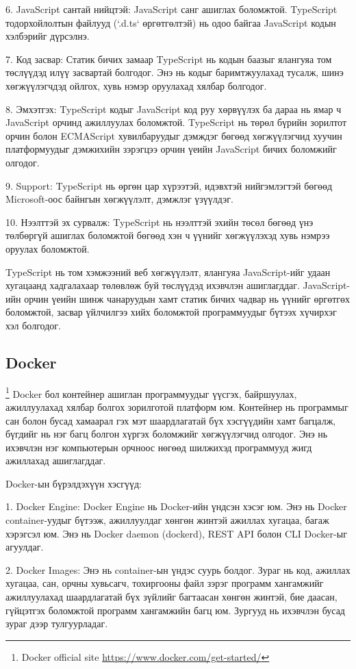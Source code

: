 			6. JavaScript сантай нийцтэй: JavaScript санг ашиглах боломжтой. TypeScript тодорхойлолтын файлууд (`.d.ts` өргөтгөлтэй) нь одоо байгаа JavaScript кодын хэлбэрийг дүрсэлнэ.
			
			7. Код засвар: Статик бичих замаар TypeScript нь кодын баазыг ялангуяа том төслүүдэд илүү засвартай болгодог. Энэ нь кодыг баримтжуулахад тусалж, шинэ хөгжүүлэгчдэд ойлгох, хувь нэмэр оруулахад хялбар болгодог.
			
			8. Эмхэтгэх: TypeScript кодыг JavaScript код руу хөрвүүлэх ба дараа нь ямар ч JavaScript орчинд ажиллуулах боломжтой. TypeScript нь төрөл бүрийн зорилтот орчин болон ECMAScript хувилбаруудыг дэмждэг бөгөөд хөгжүүлэгчид хуучин платформуудыг дэмжихийн зэрэгцээ орчин үеийн JavaScript бичих боломжийг олгодог.
			
			9. Support: TypeScript нь өргөн цар хүрээтэй, идэвхтэй нийгэмлэгтэй бөгөөд Microsoft-оос байнгын хөгжүүлэлт, дэмжлэг үзүүлдэг.
			
			10. Нээлттэй эх сурвалж: TypeScript нь нээлттэй эхийн төсөл бөгөөд үнэ төлбөргүй ашиглах боломжтой бөгөөд хэн ч үүнийг хөгжүүлэхэд хувь нэмрээ оруулах боломжтой.
			
			TypeScript нь том хэмжээний веб хөгжүүлэлт, ялангуяа JavaScript-ийг удаан хугацаанд хадгалахаар төлөвлөж буй төслүүдэд ихэвчлэн ашиглагддаг. JavaScript-ийн орчин үеийн шинж чанаруудын хамт статик бичих чадвар нь үүнийг өргөтгөх боломжтой, засвар үйлчилгээ хийх боломжтой программуудыг бүтээх хүчирхэг хэл болгодог. 
	\pagebreak
\subsection{Docker}
		\footnote{Docker official site \url{https://www.docker.com/get-started/}}
			\quad \quad Docker бол контейнер ашиглан программуудыг үүсгэх, байршуулах, ажиллуулахад хялбар болгох зорилготой платформ юм. Контейнер нь программыг сан болон бусад хамаарал гэх мэт шаардлагатай бүх хэсгүүдийн хамт багцалж, бүгдийг нь нэг багц болгон хүргэх боломжийг хөгжүүлэгчид олгодог. Энэ нь ихэвчлэн нэг компьютерын орчноос нөгөөд шилжихэд программууд жигд ажиллахад ашиглагддаг.

			Docker-ын бүрэлдэхүүн хэсгүүд:
			
			1. Docker Engine: Docker Engine нь Docker-ийн үндсэн хэсэг юм. Энэ нь Docker container-уудыг бүтээж, ажиллуулдаг хөнгөн жинтэй ажиллах хугацаа, багаж хэрэгсэл юм. Энэ нь Docker daemon (dockerd), REST API болон CLI Docker-ыг агуулдаг.
			
			2. Docker Images: Энэ нь container-ын үндэс суурь болдог. Зураг нь код, ажиллах хугацаа, сан, орчны хувьсагч, тохиргооны файл зэрэг программ хангамжийг ажиллуулахад шаардлагатай бүх зүйлийг багтаасан хөнгөн жинтэй, бие даасан, гүйцэтгэх боломжтой программ хангамжийн багц юм. Зургууд нь ихэвчлэн бусад зураг дээр тулгуурладаг.
			
